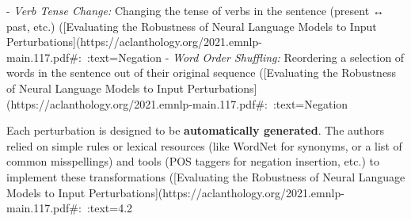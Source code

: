   - \textit{Verb Tense Change:} Changing the tense of verbs in the sentence (present ↔ past, etc.) ([Evaluating the Robustness of Neural Language Models to Input Perturbations](https://aclanthology.org/2021.emnlp-main.117.pdf#:~:text=Negation%
  - \textit{Word Order Shuffling:} Reordering a selection of words in the sentence out of their original sequence ([Evaluating the Robustness of Neural Language Models to Input Perturbations](https://aclanthology.org/2021.emnlp-main.117.pdf#:~:text=Negation%
  
Each perturbation is designed to be \textbf{automatically generated}. The authors relied on simple rules or lexical resources (like WordNet for synonyms, or a list of common misspellings) and tools (POS taggers for negation insertion, etc.) to implement these transformations ([Evaluating the Robustness of Neural Language Models to Input Perturbations](https://aclanthology.org/2021.emnlp-main.117.pdf#:~:text=4.2%

